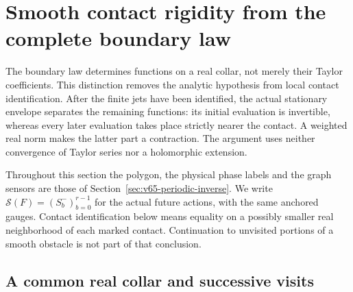 \section{Smooth contact rigidity from the complete boundary law}
\label{sec:v68-smooth-contact}

The boundary law determines functions on a real collar, not merely their
Taylor coefficients.  This distinction removes the analytic hypothesis
from local contact identification.  After the finite jets have been
identified, the actual stationary envelope separates the remaining
functions: its initial evaluation is invertible, whereas every later
evaluation takes place strictly nearer the contact.  A weighted real
norm makes the latter part a contraction.  The argument uses neither
convergence of Taylor series nor a holomorphic extension.

Throughout this section the polygon, the physical phase labels and the
graph sensors are those of Section~\ref{sec:v65-periodic-inverse}.
We write $\mathcal S(F)=(S_b^-)_{b=0}^{r-1}$ for the actual future
actions, with the same anchored gauges.  Contact identification below
means equality on a possibly smaller real neighborhood of each marked
contact.  Continuation to unvisited portions of a smooth obstacle is
not part of that conclusion.

\subsection{A common real collar and successive visits}

